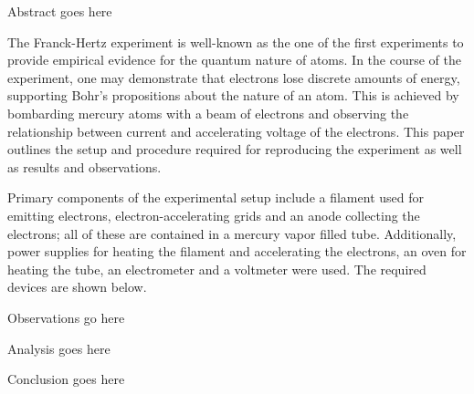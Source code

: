 
\physics

\begin{paperabs}

	Abstract goes here
	
\end{paperabs}

\begin{paper}
	
	
	The Franck-Hertz experiment is well-known as the one of the first experiments to provide empirical evidence for the quantum nature of atoms. In the course of the experiment, one may demonstrate that electrons lose discrete amounts of energy, supporting Bohr's propositions about the nature of an atom. This is achieved by bombarding mercury atoms with a beam of electrons and observing the relationship between current and accelerating voltage of the electrons. This paper outlines the setup and procedure required for reproducing the experiment as well as results and observations. 
	
	Primary components of the experimental setup include a filament used for emitting electrons, electron-accelerating grids and an anode collecting the electrons; all of these are contained in a mercury vapor filled tube. Additionally, power supplies for heating the filament and accelerating the electrons, an oven for heating the tube, an electrometer and a voltmeter were used. The required devices are shown below.
	

	
	Observations go here
	
	
	Analysis goes here
	

	Conclusion goes here
	


\end{paper}
